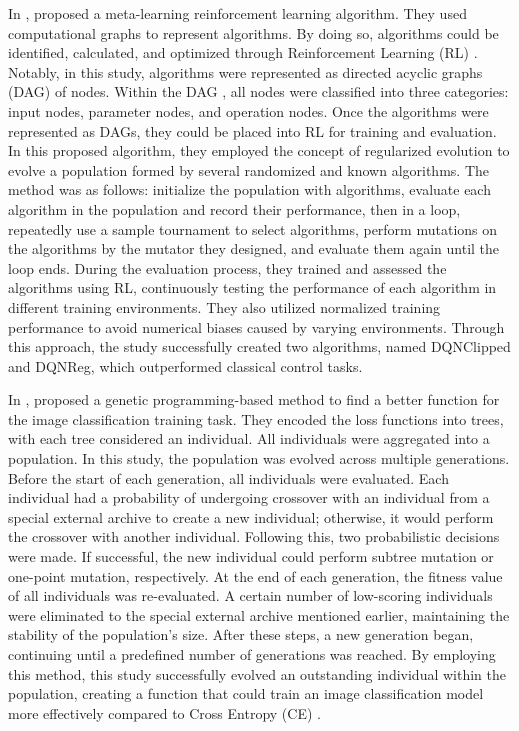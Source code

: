 \begin{ZhChapter}
    In \cite{coreyes2022evolvingreinforcementlearningalgorithms}, \citeauthor{coreyes2022evolvingreinforcementlearningalgorithms} proposed a meta-learning reinforcement learning algorithm. They used computational graphs to represent algorithms. By doing so, algorithms could be identified, calculated, and optimized through Reinforcement Learning (RL) \cite{kaelbling1996reinforcement}. Notably, in this study, algorithms were represented as directed acyclic graphs (DAG) \cite{thost2021directedacyclicgraphneural} of nodes. Within the DAG , all nodes were classified into three categories: input nodes, parameter nodes, and operation nodes. Once the algorithms were represented as DAGs, they could be placed into RL for training and evaluation. In this proposed algorithm, they employed the concept of regularized evolution \cite{real2019regularized} to evolve a population formed by several randomized and known algorithms. The method was as follows: initialize the population with algorithms, evaluate each algorithm in the population and record their performance, then in a loop, repeatedly use a sample tournament \cite{goldberg1991comparative} to select algorithms, perform mutations on the algorithms by the mutator they designed, and evaluate them again until the loop ends. During the evaluation process, they trained and assessed the algorithms using RL, continuously testing the performance of each algorithm in different training environments. They also utilized normalized training performance to avoid numerical biases caused by varying environments. Through this approach, the study successfully created two algorithms, named DQNClipped and DQNReg, which outperformed classical control tasks.

    In \cite{akhmedova2024generationlossfunctionimage}, \citeauthor{akhmedova2024generationlossfunctionimage} proposed a genetic programming-based method to find a better function for the image classification training task. They encoded the loss functions into trees, with each tree considered an individual. All individuals were aggregated into a population. In this study, the population was evolved across multiple generations. Before the start of each generation, all individuals were evaluated. Each individual had a probability of undergoing crossover with an individual from a special external archive to create a new individual; otherwise, it would perform the crossover with another individual. Following this, two probabilistic decisions were made. If successful, the new individual could perform subtree mutation or one-point mutation, respectively. At the end of each generation, the fitness value of all individuals was re-evaluated. A certain number of low-scoring individuals were eliminated to the special external archive mentioned earlier, maintaining the stability of the population's size. After these steps, a new generation began, continuing until a predefined number of generations was reached.  By employing this method, this study successfully evolved an outstanding individual within the population, creating a function that could train an image classification model more effectively compared to Cross Entropy (CE) \cite{zhang2018generalized}.


\end{ZhChapter}
